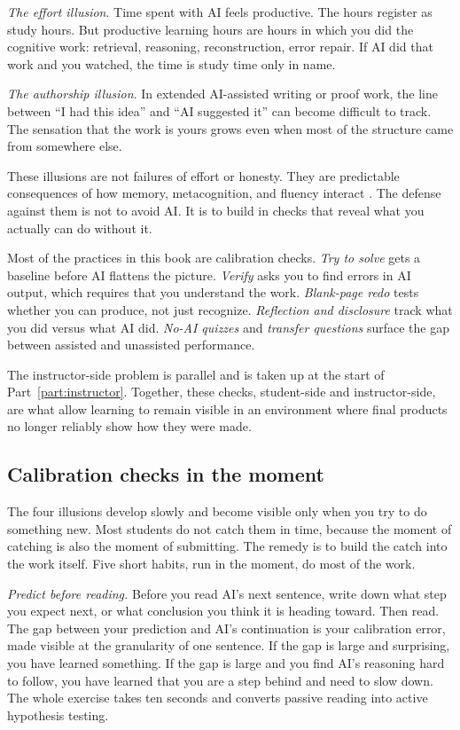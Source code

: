 \documentclass{SIAMbook2023}
\begin{document}
\emph{The effort illusion}. Time spent with AI feels productive. The hours register as study hours. But productive learning hours are hours in which you did the cognitive work: retrieval, reasoning, reconstruction, error repair. If AI did that work and you watched, the time is study time only in name.

\emph{The authorship illusion}. In extended AI-assisted writing or proof work, the line between ``I had this idea'' and ``AI suggested it'' can become difficult to track. The sensation that the work is yours grows even when most of the structure came from somewhere else.

These illusions are not failures of effort or honesty. They are predictable consequences of how memory, metacognition, and fluency interact \citep{bjork2011making,dunlosky2009metacognition}. The defense against them is not to avoid AI. It is to build in checks that reveal what you actually can do without it.

Most of the practices in this book are calibration checks. \emph{Try to solve} gets a baseline before AI flattens the picture. \emph{Verify} asks you to find errors in AI output, which requires that you understand the work. \emph{Blank-page redo} tests whether you can produce, not just recognize. \emph{Reflection and disclosure} track what you did versus what AI did. \emph{No-AI quizzes} and \emph{transfer questions} surface the gap between assisted and unassisted performance.

The instructor-side problem is parallel and is taken up at the start of Part~\ref{part:instructor}. Together, these checks, student-side and instructor-side, are what allow learning to remain visible in an environment where final products no longer reliably show how they were made.

\subsection{Calibration checks in the moment}
\label{subsec:calibration-checks-in-moment}

The four illusions develop slowly and become visible only when you try to do something new. Most students do not catch them in time, because the moment of catching is also the moment of submitting. The remedy is to build the catch into the work itself. Five short habits, run in the moment, do most of the work.

\emph{Predict before reading.} Before you read AI's next sentence, write down what step you expect next, or what conclusion you think it is heading toward. Then read. The gap between your prediction and AI's continuation is your calibration error, made visible at the granularity of one sentence. If the gap is large and surprising, you have learned something. If the gap is large and you find AI's reasoning hard to follow, you have learned that you are a step behind and need to slow down. The whole exercise takes ten seconds and converts passive reading into active hypothesis testing.
\end{document}
